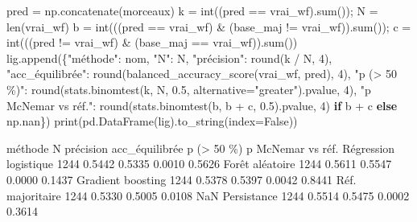 \documentclass[
  10pt,
]{article}
\newenvironment{Shaded}{}{}
\newcommand{\BuiltInTok}[1]{\textcolor[rgb]{0.00,0.50,0.00}{#1}}
\newcommand{\ControlFlowTok}[1]{\textcolor[rgb]{0.00,0.44,0.13}{\textbf{#1}}}
\newcommand{\DecValTok}[1]{\textcolor[rgb]{0.25,0.63,0.44}{#1}}
\newcommand{\FloatTok}[1]{\textcolor[rgb]{0.25,0.63,0.44}{#1}}
\newcommand{\NormalTok}[1]{#1}
\newcommand{\OperatorTok}[1]{\textcolor[rgb]{0.40,0.40,0.40}{#1}}
\newcommand{\StringTok}[1]{\textcolor[rgb]{0.25,0.44,0.63}{#1}}
\newcommand{\VariableTok}[1]{\textcolor[rgb]{0.10,0.09,0.49}{#1}}
\begin{document}
\begin{Shaded}
\begin{Highlighting}[]
\NormalTok{    pred }\OperatorTok{=}\NormalTok{ np.concatenate(morceaux)}
\NormalTok{    k }\OperatorTok{=} \BuiltInTok{int}\NormalTok{((pred }\OperatorTok{==}\NormalTok{ vrai\_wf).}\BuiltInTok{sum}\NormalTok{())}\OperatorTok{;}\NormalTok{ N }\OperatorTok{=} \BuiltInTok{len}\NormalTok{(vrai\_wf)}
\NormalTok{    b }\OperatorTok{=} \BuiltInTok{int}\NormalTok{(((pred }\OperatorTok{==}\NormalTok{ vrai\_wf) }\OperatorTok{\&}\NormalTok{ (base\_maj }\OperatorTok{!=}\NormalTok{ vrai\_wf)).}\BuiltInTok{sum}\NormalTok{())}\OperatorTok{;}\NormalTok{ c }\OperatorTok{=} \BuiltInTok{int}\NormalTok{(((pred }\OperatorTok{!=}\NormalTok{ vrai\_wf) }\OperatorTok{\&}\NormalTok{ (base\_maj }\OperatorTok{==}\NormalTok{ vrai\_wf)).}\BuiltInTok{sum}\NormalTok{())}
\NormalTok{    lig.append(\{}\StringTok{"méthode"}\NormalTok{: nom, }\StringTok{"N"}\NormalTok{: N, }\StringTok{"précision"}\NormalTok{: }\BuiltInTok{round}\NormalTok{(k }\OperatorTok{/}\NormalTok{ N, }\DecValTok{4}\NormalTok{),}
                \StringTok{"acc\_équilibrée"}\NormalTok{: }\BuiltInTok{round}\NormalTok{(balanced\_accuracy\_score(vrai\_wf, pred), }\DecValTok{4}\NormalTok{),}
                \StringTok{"p (\textgreater{} 50 \%)"}\NormalTok{: }\BuiltInTok{round}\NormalTok{(stats.binomtest(k, N, }\FloatTok{0.5}\NormalTok{, alternative}\OperatorTok{=}\StringTok{"greater"}\NormalTok{).pvalue, }\DecValTok{4}\NormalTok{),}
                \StringTok{"p McNemar vs réf."}\NormalTok{: }\BuiltInTok{round}\NormalTok{(stats.binomtest(b, b }\OperatorTok{+}\NormalTok{ c, }\FloatTok{0.5}\NormalTok{).pvalue, }\DecValTok{4}\NormalTok{) }\ControlFlowTok{if}\NormalTok{ b }\OperatorTok{+}\NormalTok{ c }\ControlFlowTok{else}\NormalTok{ np.nan\})}
\BuiltInTok{print}\NormalTok{(pd.DataFrame(lig).to\_string(index}\OperatorTok{=}\VariableTok{False}\NormalTok{))}
\end{Highlighting}
\end{Shaded}

\begin{Shaded}
\begin{Highlighting}[]
\NormalTok{              méthode    N  précision  acc\_équilibrée  p (\textgreater{} 50 \%)  p McNemar vs réf.}
\NormalTok{Régression logistique 1244     0.5442          0.5335      0.0010             0.5626}
\NormalTok{      Forêt aléatoire 1244     0.5611          0.5547      0.0000             0.1437}
\NormalTok{    Gradient boosting 1244     0.5378          0.5397      0.0042             0.8441}
\NormalTok{     Réf. majoritaire 1244     0.5330          0.5005      0.0108                NaN}
\NormalTok{          Persistance 1244     0.5514          0.5475      0.0002             0.3614}
\end{Highlighting}
\end{Shaded}
\end{document}
